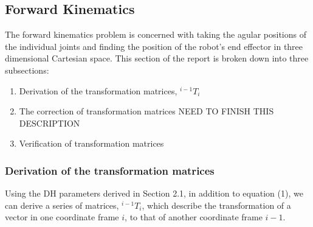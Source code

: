\documentclass[a4paper]{article}
\begin{document}
\subsection{Forward Kinematics}
The forward kinematics problem is concerned with taking the agular positions of the individual joints and finding the position of the robot's end effector in three dimensional Cartesian space. This section of the report is broken down into three subsections:
\begin{enumerate}
	\item Derivation of the transformation matrices, $^{i-1} T_i$
	\item The correction of transformation matrices NEED TO FINISH THIS DESCRIPTION
	\item Verification of transformation matrices
\end{enumerate}

\subsubsection{Derivation of the transformation matrices}
Using the DH parameters derived in Section 2.1, in addition to equation (1), we can derive a series of matrices, $^{i-1} T_i$, which describe the transformation of a vector in one coordinate frame $i$, to that of another coordinate frame $i-1$.\\
\end{document}
